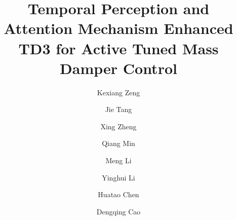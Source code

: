 \documentclass[review]{elsarticle}
\begin{document}
\begin{frontmatter}

\title{Temporal Perception and Attention Mechanism Enhanced TD3 for Active Tuned Mass Damper Control}

\author[author1]{Kexiang Zeng}
\author[author1]{Jie Tang}
\author[author1]{Xing Zheng}
\author[author2]{Qiang Min}
\author[author1]{Meng Li}
\author[author1]{Yinghui Li}
\author[author3]{Huatao Chen}
\author[author3]{Dengqing Cao}
\address[author1]{School of Mechanics and Aerospace Engineering, Southwest Jiaotong University, Chengdu 610031, China}
\address[author2]{National Key Laboratory of Digital and Agile Aircraft Design, Chengdu Aircraft Design $\&$ Research Institute, AVIC, Chengdu 610091, China}
\address[author3]{School of Mathematics and  Statistics, Shandong University of Technology, ZiBo 255000, China}


\end{frontmatter}
\end{document}
